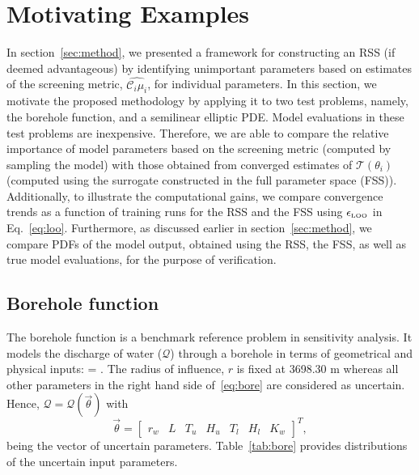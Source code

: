 \section{Motivating Examples}
\label{sec:examples}

In section~\ref{sec:method}, we presented a framework for constructing
an RSS (if deemed advantageous) by identifying unimportant parameters based on 
estimates of the screening metric, $\widehat{\mathcal{C}_i\mu_i}$,
for individual parameters.
In this section, we motivate the proposed methodology by applying it to two
test problems,
namely, the borehole function, and a semilinear elliptic PDE.
Model evaluations in these test
problems are inexpensive. Therefore, we are able to compare the 
relative importance of model parameters based
on the screening metric (computed by sampling the model) with 
those obtained from converged estimates of $\mathcal{T}(\theta_i)$ (computed
using the surrogate constructed in the
full parameter space (FSS)). Additionally, to illustrate the computational gains, 
we compare
convergence trends as a function of training runs for the RSS and the FSS using 
$\epsilon_{\mbox{\tiny LOO}}$ in Eq.~\ref{eq:loo}. 
Furthermore, as discussed earlier in section~\ref{sec:method}, we compare
PDFs of the model output, obtained using the RSS, the FSS,
as well as true model evaluations, for
the purpose of verification. 

\subsection{Borehole function}

The borehole function is a benchmark reference problem in sensitivity analysis.
It models the discharge of water ($\mathcal{Q}$) through a borehole in terms of
geometrical and physical inputs:
\be
{} = .
\label{eq:bore}
\ee
The radius of influence, $r$ is fixed at 3698.30 m whereas all other parameters
in the right hand side of~\eqref{eq:bore} are considered 
as uncertain. Hence, $\mathcal{Q} = \mathcal{Q}(\vec{\theta})$ with 
\[
\vec{\theta} = \begin{bmatrix}r_w & L & T_u & H_u & T_l & H_l & 
K_w\end{bmatrix}^T, 
\]
being the vector of
uncertain parameters. Table~\ref{tab:bore} provides distributions of the
uncertain input parameters. 



